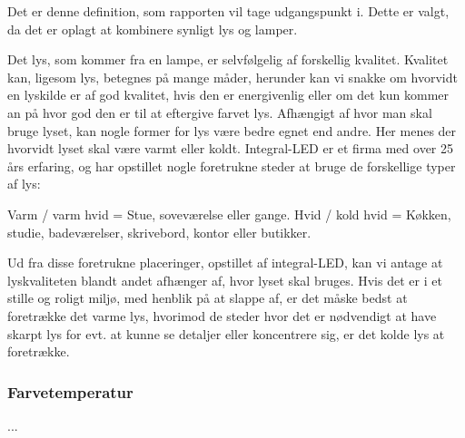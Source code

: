 Det er denne definition, som rapporten vil tage udgangspunkt i. Dette er valgt, da det er oplagt at kombinere synligt lys og lamper.

Det lys, som kommer fra en lampe, er selvfølgelig af forskellig kvalitet. Kvalitet kan, ligesom lys, betegnes på mange måder, herunder kan vi snakke om hvorvidt en lyskilde er af god kvalitet, hvis den er energivenlig eller om det kun kommer an på hvor god den er til at eftergive farvet lys. 
Afhængigt af hvor man skal bruge lyset, kan nogle former for lys være bedre egnet end andre. Her menes der hvorvidt lyset skal være varmt eller koldt. Integral-LED er et firma med over 25 års erfaring\cite{integral_led}, og har opstillet nogle foretrukne steder at bruge de forskellige typer af lys:

Varm / varm hvid = Stue, soveværelse eller gange.
Hvid / kold hvid = Køkken, studie, badeværelser, skrivebord, kontor eller butikker\cite{varm_kold}.

Ud fra disse foretrukne placeringer, opstillet af integral-LED, kan vi antage at lyskvaliteten blandt andet afhænger af, hvor lyset skal bruges. Hvis det er i et stille og roligt miljø, med henblik på at slappe af, er det måske bedst at foretrække det varme lys, hvorimod de steder hvor det er nødvendigt at have skarpt lys for evt. at kunne se detaljer eller koncentrere sig, er det kolde lys at foretrække.

\subsubsection{Farvetemperatur}
...


